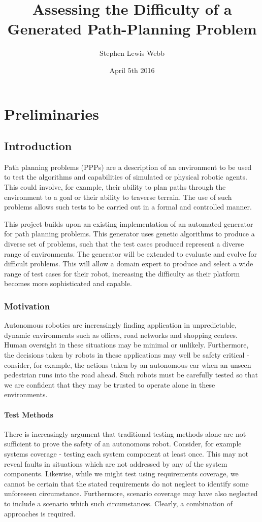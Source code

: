 \documentclass[authoryearcitations]{UoYCSproject}
\author{Stephen Lewis Webb}
\title{Assessing the Difficulty of a Generated Path-Planning Problem}
\date{April 5th 2016}
\begin{document}
\maketitle
\listoffigures
\listoftables


\part{Preliminaries}
\label{sec:start}
\thispagestyle{empty}
\chapter{Introduction}
\label{cha:Introduction}
Path planning problems (PPPs) are a description of an environment to be used to test the algorithms and capabilities of simulated or physical robotic agents. This could involve, for example, their ability to plan paths through the environment to a goal or their ability to traverse terrain. The use of such problems allows such tests to be carried out in a formal and controlled manner.

This project builds upon an existing implementation of an automated generator for path planning problems. This generator uses genetic algorithms to produce a diverse set of problems, such that the test cases produced represent a diverse range of environments. The generator will be extended to evaluate and evolve for difficult problems. This will allow a domain expert to produce and select a wide range of test cases for their robot, increasing the difficulty as their platform becomes more sophisticated and capable.

\section{Motivation}
\label{sec:Motivation}
Autonomous robotics are increasingly finding application in unpredictable, dynamic environments such as offices, road networks and shopping centres. Human oversight in these situations may be minimal or unlikely. Furthermore, the decisions taken by robots in these applications may well be safety critical - consider, for example, the actions taken by an autonomous car when an unseen pedestrian runs into the road ahead. Such robots must be carefully tested so that we are confident that they may be trusted to operate alone in these environments.
\subsection{Test Methods}
\label{sec:test_methods}
There is increasingly argument that traditional testing methods alone are not sufficient to prove the safety of an autonomous robot. Consider, for example systems coverage - testing each system component at least once. This may not reveal faults in situations which are not addressed by any of the system components. Likewise, while we might test using requirements coverage, we cannot be certain that the stated requirements do not neglect to identify some unforeseen circumstance. Furthermore, scenario coverage may have also neglected to include a scenario which such circumstances. Clearly, a combination of approaches is required.
\end{document}
